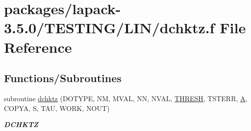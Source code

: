 \hypertarget{dchktz_8f}{}\section{packages/lapack-\/3.5.0/\+T\+E\+S\+T\+I\+N\+G/\+L\+I\+N/dchktz.f File Reference}
\label{dchktz_8f}
\subsection*{Functions/\+Subroutines}
\begin{DoxyCompactItemize}
\item 
subroutine \hyperlink{group__double__lin_ga69077db179ac8bab53f2deaef9e38d70}{dchktz} (D\+O\+T\+Y\+P\+E, N\+M, M\+V\+A\+L, N\+N, N\+V\+A\+L, \hyperlink{zlaqgs_8c_a0656018abfc9fa2821827415f5d5ea57}{T\+H\+R\+E\+S\+H}, T\+S\+T\+E\+R\+R, \hyperlink{classA}{A}, C\+O\+P\+Y\+A, S, T\+A\+U, W\+O\+R\+K, N\+O\+U\+T)
\begin{DoxyCompactList}\small\item\em {\bfseries D\+C\+H\+K\+T\+Z} \end{DoxyCompactList}\end{DoxyCompactItemize}
